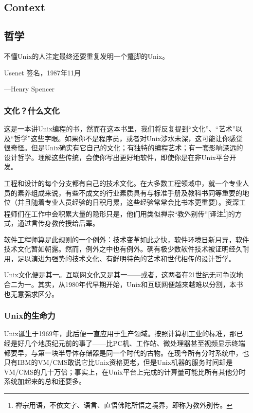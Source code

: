 \documentclass[12pt,oneside]{book}
\begin{document}
\begin{common-format}
\mainmatter 

\part{Context}
\chapter{哲学}

\begin{flushright}
\begin{notecard}{17em}
不懂Unix的人注定最终还要重复发明一个蹩脚的Unix。

{\hfill Usenet 签名，1987年11月}

{\hfill —Henry Spencer}
\end{notecard}
\end{flushright}


\section{文化？什么文化}
这是一本讲Unix编程的书，然而在这本书里，我们将反复提到“文化”、“艺术”以及“哲学”这些字眼。如果你不是程序员，或者对Unix涉水未深，这可能让你感觉很奇怪。但是Unix确实有它自己的文化；有独特的编程艺术；有一套影响深远的设计哲学。理解这些传统，会使你写出更好地软件，即使你是在非Unix平台开发。

工程和设计的每个分支都有自己的技术文化。在大多数工程领域中，就一个专业人员的素养组成来说，有些不成文的行业素质具有与标准手册及教科书同等重要的地位（并且随着专业人员经验的日积月累，这些经验常常会比书本更重要）。资深工程师们在工作中会积累大量的隐形只是，他们用类似禅宗“教外别传”[译注\footnote{禅宗用语，不依文字、语言、直悟佛陀所悟之境界，即称为教外别传。}]的方式，通过言传身教传授给后辈。

软件工程师算是此规则的一个例外：技术变革如此之快，软件环境日新月异，软件技术文化暂如朝露。然而，例外之中也有例外。确有极少数软件技术被证明经久耐用，足以演进为强势的技术文化、有鲜明特色的艺术和世代相传的设计哲学。

Unix文化便是其一。互联网文化又是其一——或者，这两者在21世纪无可争议地合二为一。其实，从1980年代早期开始，Unix和互联网便越来越难以分割，本书也无意强求区分。


\section{Unix的生命力}
Unix诞生于1969年，此后便一直应用于生产领域。按照计算机工业的标准，那已经是好几个地质纪元前的事了——比PC机、工作站、微处理器甚至视频显示终端都要早，与第一块半导体存储器是同一个时代的古物。在现今所有分时系统中，也只有IBM的VM/CMS敢说它比Unix资格更老，但是Unix机器的服务时间却是VM/CMS的几十万倍；事实上，在Unix平台上完成的计算量可能比所有其他分时系统加起来的总和还要多。


\end{common-format}
\end{document}

